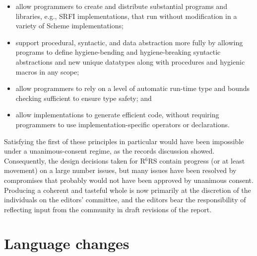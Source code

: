 \documentclass{sigplanconf}
\newcommand{\rn}[1]{R$^{#1}$RS}
\begin{document}
\begin{itemize}
\item allow programmers to create and distribute substantial programs
  and libraries, e.g., SRFI implementations, that run without
  modification in a variety of Scheme implementations;
  
\item support procedural, syntactic, and data abstraction more fully
  by allowing programs to define hygiene-bending and hygiene-breaking
  syntactic abstractions and new unique datatypes along with
  procedures and hygienic macros in any scope;
  
\item allow programmers to rely on a level of automatic run-time type
  and bounds checking sufficient to ensure type safety; and

\item allow implementations to generate efficient code, without
  requiring programmers to use implementation-specific operators or
  declarations.
\end{itemize}
%
Satisfying the first of these principles in particular would have been
impossible under a unanimous-consent regime, as the records discussion
showed.  Consequently, the design decisions taken for \rn{6} contain
progress (or at least movement) on a large number issues, but many
issues have been resolved by compromises that probably would not have
been approved by unanimous consent.  Producing a coherent and tasteful
whole is now primarily at the discretion of the individuals on the
editors' committee, and the editors bear the responsibility of
reflecting input from the community in draft revisions of the report.

\section{Language changes}
\label{sec:changes}
\end{document}
